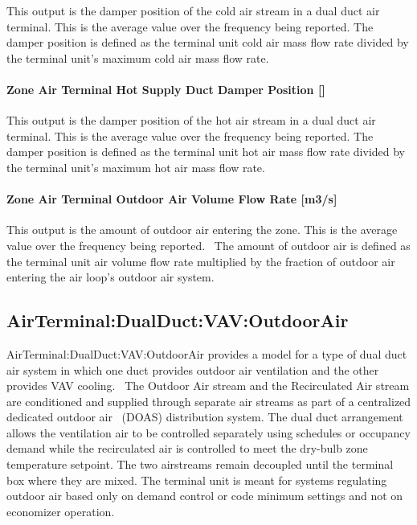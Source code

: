 This output is the damper position of the cold air stream in a dual duct air terminal. This is the average value over the frequency being reported. The damper position is defined as the terminal unit cold air mass flow rate divided by the terminal unit's maximum cold air mass flow rate.

\paragraph{Zone Air Terminal Hot Supply Duct Damper Position {[]}}\label{zone-air-terminal-hot-supply-duct-damper-position-1}

This output is the damper position of the hot air stream in a dual duct air terminal. This is the average value over the frequency being reported. The damper position is defined as the terminal unit hot air mass flow rate divided by the terminal unit's maximum hot air mass flow rate.

\paragraph{Zone Air Terminal Outdoor Air Volume Flow Rate {[}m3/s{]}}\label{zone-air-terminal-outdoor-air-volume-flow-rate-m3s-2}

This output is the amount of outdoor air entering the zone. This is the average value over the frequency being reported.~ The amount of outdoor air is defined as the terminal unit air volume flow rate multiplied by the fraction of outdoor air entering the air loop's outdoor air system.

\subsection{AirTerminal:DualDuct:VAV:OutdoorAir}\label{airterminaldualductvavoutdoorair}

AirTerminal:DualDuct:VAV:OutdoorAir provides a model for a type of dual duct air system in which one duct provides outdoor air ventilation and the other provides VAV cooling.~ The Outdoor Air stream and the Recirculated Air stream are conditioned and supplied through separate air streams as part of a centralized dedicated outdoor air~ (DOAS) distribution system. The dual duct arrangement allows the ventilation air to be controlled separately using schedules or occupancy demand while the recirculated air is controlled to meet the dry-bulb zone temperature setpoint. The two airstreams remain decoupled until the terminal box where they are mixed. The terminal unit is meant for systems regulating outdoor air based only on demand control or code minimum settings and not on economizer operation.

